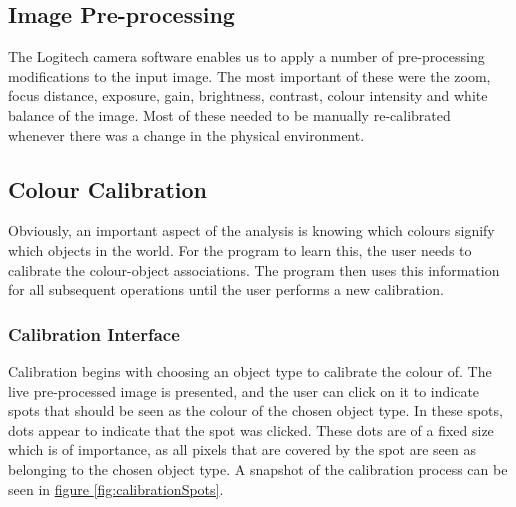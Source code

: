 \documentclass[10pt, abstracton]{scrartcl}
\newcommand{\fref}[1]{\hyperref[#1]{figure \vref{#1}}}
\begin{document}
\subsection{Image Pre-processing}
The Logitech camera software enables us to apply a number of pre-processing modifications to the input image. The most important of these were the zoom, focus distance, exposure, gain, brightness, contrast, colour intensity and white balance of the image. Most of these needed to be manually re-calibrated whenever there was a change in the physical environment.


\subsection{Colour Calibration}
Obviously, an important aspect of the analysis is knowing which colours signify which objects in the world. For the program to learn this, the user needs to calibrate the colour-object associations. The program then uses this information for all subsequent operations until the user performs a new calibration.

\subsubsection{Calibration Interface}
Calibration begins with choosing an object type to calibrate the colour of. The live pre-processed image is presented, and the user can click on it to indicate spots that should be seen as the colour of the chosen object type. In these spots, dots appear to indicate that the spot was clicked. These dots are of a fixed size which is of importance, as all pixels that are covered by the spot are seen as belonging to the chosen object type. A snapshot of the calibration process can be seen in \fref{fig:calibrationSpots}.
\end{document}
